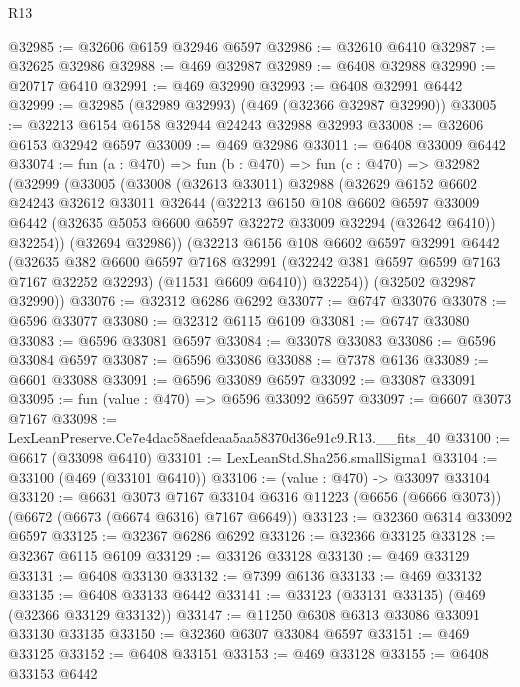 \begin{lexlean}{R13}
\begin{coremodule}
@32985 := @32606 @6159 @32946 @6597
@32986 := @32610 @6410
@32987 := @32625 @32986
@32988 := @469 @32987
@32989 := @6408 @32988
@32990 := @20717 @6410
@32991 := @469 @32990
@32993 := @6408 @32991 @6442
@32999 := @32985 (@32989 @32993) (@469 (@32366 @32987 @32990))
@33005 := @32213 @6154 @6158 @32944 @24243 @32988 @32993
@33008 := @32606 @6153 @32942 @6597
@33009 := @469 @32986
@33011 := @6408 @33009 @6442
@33074 := fun (a : @470) =>
  fun (b : @470) =>
  fun (c : @470) =>
  @32982
    (@32999
      (@33005
        (@33008
          (@32613 @33011)
          @32988
          (@32629
            @6152
            @6602
            @24243
            @32612
            @33011
            @32644
            (@32213
              @6150
              @108
              @6602
              @6597
              @33009
              @6442
              (@32635 @5053 @6600 @6597 @32272 @33009 @32294 (@32642 @6410))
              @32254))
          (@32694 @32986))
        (@32213
          @6156
          @108
          @6602
          @6597
          @32991
          @6442
          (@32635
            @382
            @6600
            @6597
            @7168
            @32991
            (@32242 @381 @6597 @6599 @7163 @7167 @32252 @32293)
            (@11531 @6609 @6410))
          @32254))
      (@32502 @32987 @32990))
@33076 := @32312 @6286 @6292
@33077 := @6747 @33076
@33078 := @6596 @33077
@33080 := @32312 @6115 @6109
@33081 := @6747 @33080
@33083 := @6596 @33081 @6597
@33084 := @33078 @33083
@33086 := @6596 @33084 @6597
@33087 := @6596 @33086
@33088 := @7378 @6136
@33089 := @6601 @33088
@33091 := @6596 @33089 @6597
@33092 := @33087 @33091
@33095 := fun (value : @470) => @6596 @33092 @6597
@33097 := @6607 @3073 @7167
@33098 := LexLeanPreserve.Ce7e4dac58aefdeaa5aa58370d36e91c9.R13.__fits_40
@33100 := @6617 (@33098 @6410)
@33101 := LexLeanStd.Sha256.smallSigma1
@33104 := @33100 (@469 (@33101 @6410))
@33106 := (value : @470) -> @33097 @33104
@33120 := @6631
    @3073
    @7167
    @33104
    @6316
    @11223
    (@6656 (@6666 @3073))
    (@6672 (@6673 (@6674 @6316) @7167 @6649))
@33123 := @32360 @6314 @33092 @6597
@33125 := @32367 @6286 @6292
@33126 := @32366 @33125
@33128 := @32367 @6115 @6109
@33129 := @33126 @33128
@33130 := @469 @33129
@33131 := @6408 @33130
@33132 := @7399 @6136
@33133 := @469 @33132
@33135 := @6408 @33133 @6442
@33141 := @33123 (@33131 @33135) (@469 (@32366 @33129 @33132))
@33147 := @11250 @6308 @6313 @33086 @33091 @33130 @33135
@33150 := @32360 @6307 @33084 @6597
@33151 := @469 @33125
@33152 := @6408 @33151
@33153 := @469 @33128
@33155 := @6408 @33153 @6442

\end{coremodule}
\end{lexlean}

